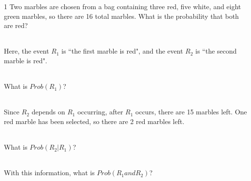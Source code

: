 \documentclass[a4paper,12pt]{book}
\newcounter{question}
\begin{document}
\notonkey{ \newpage }{ \hrulefill }

    
        \begin{question}{\thequestion}{1}
            Two marbles are chosen from a bag containing three red, five white, and eight green marbles,
            so there are 16 total marbles.
            What is the probability that both are red?

            ~\\
            Here, the event $R_{1}$ is ``the first marble is red",
            and the event $R_{2}$ is ``the second marble is red".

            ~\\
            What is $Prob(R_{1})$?

            ~\\
            Since $R_{2}$ depends on $R_{1}$ occurring, after $R_{1}$
            occurs, there are 15 marbles left. One red marble
            has been selected, so there are 2 red marbles left.

            ~\\
            What is $Prob(R_{2} | R_{1})$?

            ~\\
            With this information, what is $Prob(R_{1} and R_{2})$?


        \end{question}
\end{document}

